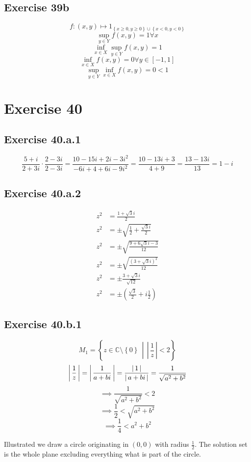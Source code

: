 \documentclass[a4paper]{article}
\theoremstyle{definition}
\newcommand\abs[1]{\left|\thinspace #1\thinspace\right|}
\newcommand\set[1]{\left\{#1\right\}}
\newcommand\setdef[2]{\left\{#1\,\middle|\,#2\right\}}
\newcommand\card[1]{\left|\,#1\,\right|}
\begin{document}
\subsection{Exercise 39b}
\[ f: (x, y) \mapsto 1_{\set{ x \geq 0, y \geq 0} \cup \set{x < 0, y < 0}} \]
\[ \sup_{y \in Y} f(x, y) = 1 \forall x \]
\[ \inf_{x \in X} \sup_{y \in Y} f(x, y) = 1 \]
\[ \inf_{x \in X} f(x, y) = 0 \forall y \in [-1, 1] \]
\[ \sup_{y \in Y} \inf_{x \in X} f(x, y) = 0 < 1 \]

\section{Exercise 40}

\subsection{Exercise 40.a.1}
\[
    \frac{5+i}{2+3i} \cdot \frac{2 - 3i}{2 - 3i}
    = \frac{10 - 15i + 2i - 3i^2}{-6i + 4 + 6i - 9i^2}
    = \frac{10 - 13i + 3}{4 + 9}
    = \frac{13 - 13i}{13}
    = 1 - i
\]

\subsection{Exercise 40.a.2}
\begin{align*}
  z^2 &= \frac{1 + \sqrt{3}i}{2} \\
  z^2 &= \pm \sqrt{\frac12 + \frac{\sqrt{3}i}{2}} \\
  z^2 &= \pm \sqrt{\frac{9 + 6\sqrt{3} i - 3}{12}} \\
  z^2 &= \pm \sqrt{\frac{(3 + \sqrt{3}i)^2}{12}} \\
  z^2 &= \pm \frac{3 + \sqrt{3}i}{\sqrt{12}} \\
  z^2 &= \pm \left(\frac{\sqrt{3}}{2} + i\frac12\right)
\end{align*}

\subsection{Exercise 40.b.1}
\[ M_1 = \setdef{z \in \mathbb C \setminus \set{0}}{\card{\frac1z} < 2} \]
\[
    \abs{\frac1z}
    = \abs{\frac1{a + bi}}
    = \frac{\abs{1}}{\abs{a + bi}}
    = \frac{1}{\sqrt{a^2 + b^2}}
\] \[
    \implies \frac{1}{\sqrt{a^2 + b^2}} < 2
\] \[
    \implies \frac12 < \sqrt{a^2 + b^2}
\] \[
    \implies \frac14 < a^2 + b^2
\]

Illustrated we draw a circle originating in $(0, 0)$ with radius $\frac12$.
The solution set is the whole plane excluding everything what is part of the circle.
\end{document}
